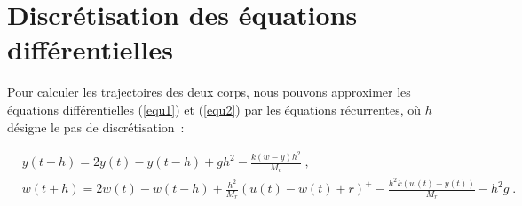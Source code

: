 \documentclass[a4paper,11pt]{amsart}
\begin{document}
\section{Discr\'etisation des \'equations diff\'erentielles}
Pour calculer les trajectoires des deux corps, nous pouvons approximer
les \'equations diff\'erentielles (\ref{equ1}) et (\ref{equ2}) par les
\'equations r\'ecurrentes, o\`u $h$ d\'esigne le pas de discr\'etisation~:

\begin{align*}
& y(t+h)=2y(t)-y(t-h)+gh^2-\frac{k(w-y)h^2}{M_v}\;,\\
& w(t+h)=2w(t)-w(t-h)+\frac{h^2}{M_r}(u(t)-w(t)+r)^+-\frac{h^2k(w(t)-y(t))}{M_r}-h^2g\;.
\end{align*}
\end{document}

